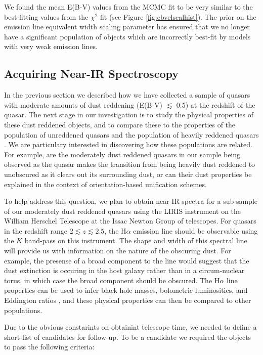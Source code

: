 We found the mean E(B-V) values from the MCMC fit to be very similar to the best-fitting values from the $\chi^2$ fit (see Figure \ref{fig:ebvelscalhist}). The prior on the emission line equivalent width scaling parameter has ensured that we no longer have a significant population of objects which are incorrectly best-fit by models with very weak emission lines.

\subsection{Acquiring Near-IR Spectroscopy}

In the previous section we described how we have collected a sample of quasars with moderate amounts of dust reddening (E(B-V) $\lesssim$ 0.5) at the redshift of the quasar. The next stage in our investigation is to study the physical properties of these dust reddened objects, and to compare these to the properties of the population of unreddened quasars and the population of heavily reddened quasars \citep[e.g.][]{banerji12}. We are particulary interested in discovering how these populations are related. For example, are the moderately dust reddened quasars in our sample being observed as the quasar makes the transition from being heavily dust reddened to unobscured as it clears out its surrounding dust, or can their dust properties be explained in the context of orientation-based unification schemes.   

To help address this question, we plan to obtain near-IR spectra for a sub-sample of our moderately dust reddened quasars using the LIRIS instrument on the William Herschel Telescope at the Issac Newton Group of telescopes. For quasars in the redshift range $2 \lesssim z \lesssim 2.5$, the H$\alpha$ emission line should be observable using the $K$ band-pass on this instrument. The shape and width of this spectral line will provide us with information on the nature of the obscuring dust. For example, the presense of a broad component to the line would suggest that the dust extinction is occuring in the host galaxy rather than in a circum-nuclear torus, in which case the broad component should be obscured. The H$\alpha$ line properties can be used to infer black hole masses, bolometric luminosities, and Eddington ratios \citep{banerji12}, and these physical properties can then be compared to other populations.  

Due to the obvious constarints on obtainint telescope time, we needed to define a short-list of candidates for follow-up. To be a candidate we required the objects to pass the following criteria:

